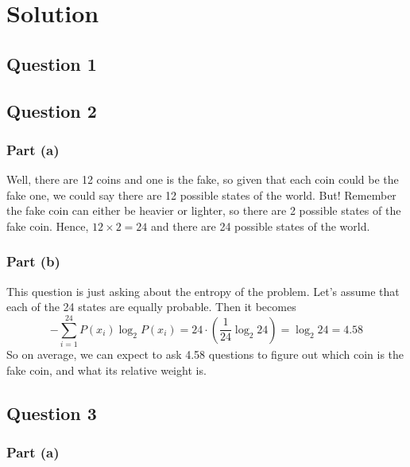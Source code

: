 \documentclass[11pt]{article}
\begin{document}
\section*{Solution}

\subsection*{Question 1}


\subsection*{Question 2}

\subsubsection*{Part (a)}

Well, there are 12 coins and one is the fake, so given that each coin could be the fake one, we could say there are 12 possible states of the world. But! Remember the fake coin can either be heavier or lighter, so there are 2 possible states of the fake coin. Hence, $12\times2=24$ and there are 24 possible states of the world.

\subsubsection*{Part (b)}

This question is just asking about the entropy of the problem. Let's assume that each of the 24 states are equally probable. Then it becomes
\[
-\sum_{i=1}^{24} P(x_i)\log_2 P(x_i) = 24 \cdot \left(\frac{1}{24}\log_2 24\right)= \log_2 24 = 4.58
\]
So on average, we can expect to ask 4.58 questions to figure out which coin is the fake coin, and what its relative weight is.

\subsection*{Question 3}

\subsubsection*{Part (a)}
\end{document}

